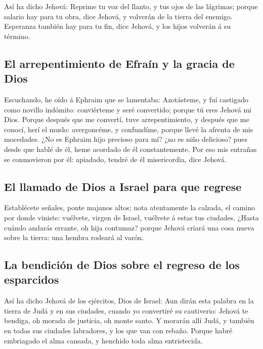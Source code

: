  Así ha dicho Jehová: Reprime tu voz del llanto, y tus
ojos de las lágrimas; porque salario hay para tu obra, dice Jehová, y
volverán de la tierra del enemigo.  Esperanza también hay
para tu fin, dice Jehová, y los hijos volverán á su término.

\hypertarget{el-arrepentimiento-de-efrauxedn-y-la-gracia-de-dios}{%
\subsection{El arrepentimiento de Efraín y la gracia de
Dios}\label{el-arrepentimiento-de-efrauxedn-y-la-gracia-de-dios}}

 Escuchando, he oído á Ephraim que se lamentaba:
Azotásteme, y fuí castigado como novillo indómito: conviérteme y seré
convertido; porque tú eres Jehová mi Dios.  Porque
después que me convertí, tuve arrepentimiento, y después que me conocí,
herí el muslo: avergoncéme, y confundíme, porque llevé la afrenta de mis
mocedades.  ¿No es Ephraim hijo precioso para mí? ¿no es
niño delicioso? pues desde que hablé de él, heme acordado de él
constantemente. Por eso mis entrañas se conmovieron por él: apiadado,
tendré de él misericordia, dice Jehová.

\hypertarget{el-llamado-de-dios-a-israel-para-que-regrese}{%
\subsection{El llamado de Dios a Israel para que
regrese}\label{el-llamado-de-dios-a-israel-para-que-regrese}}

 Establécete señales, ponte majanos altos; nota
atentamente la calzada, el camino por donde viniste: vuélvete, virgen de
Israel, vuélvete á estas tus ciudades.  ¿Hasta cuándo
andarás errante, oh hija contumaz? porque Jehová criará una cosa nueva
sobre la tierra: una hembra rodeará al varón.

\hypertarget{la-bendiciuxf3n-de-dios-sobre-el-regreso-de-los-esparcidos}{%
\subsection{La bendición de Dios sobre el regreso de los
esparcidos}\label{la-bendiciuxf3n-de-dios-sobre-el-regreso-de-los-esparcidos}}

 Así ha dicho Jehová de los ejércitos, Dios de Israel:
Aun dirán esta palabra en la tierra de Judá y en sus ciudades, cuando yo
convertiré su cautiverio: Jehová te bendiga, oh morada de justicia, oh
monte santo.  Y morarán allí Judá, y también en todas sus
ciudades labradores, y los que van con rebaño.  Porque
habré embriagado el alma cansada, y henchido toda alma entristecida.

